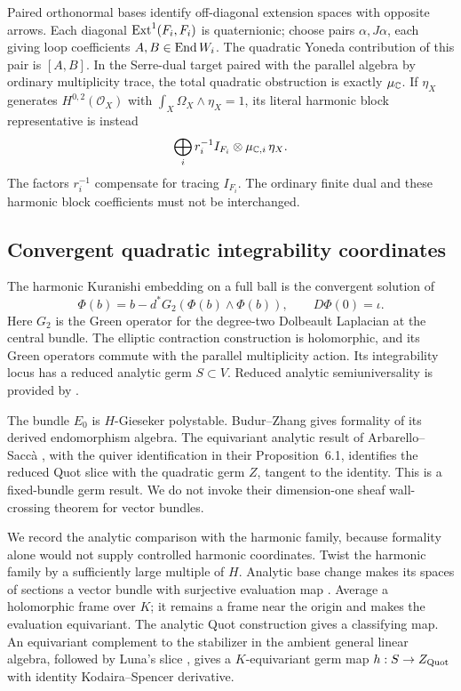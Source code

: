 Paired orthonormal bases identify off-diagonal extension spaces
with opposite arrows. Each diagonal $\operatorname{Ext}^1(F_i,F_i)$ is
quaternionic; choose pairs $\alpha,J\alpha$, each giving loop
coefficients $A,B\in\operatorname{End} W_i$. The quadratic Yoneda contribution
of this pair is $[A,B]$. In the Serre-dual target paired with the
parallel algebra by ordinary multiplicity trace, the total quadratic
obstruction is exactly $\mu_{\mathbb C}$.
If $\eta_X$ generates $H^{0,2}(\mathcal O_X)$ with
$\int_X\Omega_X\wedge\eta_X=1$, its literal harmonic block
representative is instead
\begin{equation}\label{eq:rank-dual}
 \bigoplus_i r_i^{-1} I_{F_i}\otimes\mu_{\mathbb C,i}\,\eta_X.
\end{equation}
The factors $r_i^{-1}$ compensate for tracing $I_{F_i}$.
The ordinary finite dual and these harmonic block coefficients
must not be interchanged.

\subsection{Convergent quadratic integrability coordinates}
The harmonic Kuranishi embedding on a full ball is the convergent
solution of
\begin{equation}\label{eq:kuranishi-embedding}
 \Phi(b)=b-d^*G_2(\Phi(b)\wedge\Phi(b)),\qquad D\Phi(0)=\iota.
\end{equation}
Here $G_2$ is the Green operator for the degree-two Dolbeault
Laplacian at the central bundle. The elliptic contraction construction is holomorphic, and its
Green operators commute with the parallel multiplicity action.
Its integrability locus has a reduced analytic germ $S\subset V$.
Reduced analytic semiuniversality is provided by
\cite[\S5 and Remark~4]{BS21}.

The bundle $E_0$ is $H$-Gieseker polystable. Budur--Zhang
\cite[Theorem~1.2]{BZ19} gives formality of its derived
endomorphism algebra. The equivariant analytic result of
Arbarello--Sacc\`a \cite[Proposition~4.4]{AS18}, with the quiver
identification in their Proposition~6.1, identifies the reduced
Quot slice with the quadratic germ $Z$, tangent to the identity.
This is a fixed-bundle germ result. We do not invoke their
dimension-one sheaf wall-crossing theorem for vector bundles.

We record the analytic comparison with the harmonic family,
because formality alone would not supply controlled harmonic
coordinates. Twist the harmonic family by a sufficiently large
multiple of $H$. Analytic base change makes its spaces of sections
a vector bundle with surjective evaluation map
\cite[Corollaries~1.4--1.5 and Theorem~3.1]{Gro61a}.
Average a holomorphic frame over $K$; it remains a frame near the
origin and makes the evaluation equivariant.
The analytic Quot construction \cite[Theorem~1.1]{Gro61b} gives a
classifying map. An equivariant complement to the stabilizer in
the ambient general linear algebra, followed by Luna's slice
\cite{Lun73}, gives a $K$-equivariant germ map
$h:S\to Z_{\rm Quot}$ with identity Kodaira--Spencer derivative.


